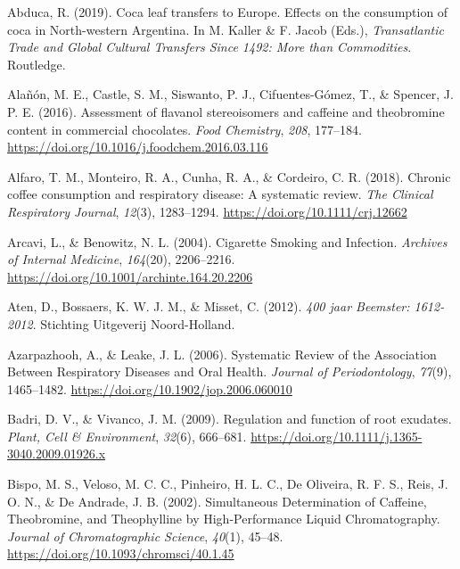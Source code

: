 \documentclass[
  b5paper,
]{book}
\newlength{\cslhangindent}
\newenvironment{CSLReferences}[2] %
 {\begin{list}{}{%
  \setlength{\itemindent}{0pt}
  \setlength{\leftmargin}{0pt}
  \setlength{\parsep}{0pt}
  \ifodd #1
   \setlength{\leftmargin}{\cslhangindent}
   \setlength{\itemindent}{-1\cslhangindent}
  \fi
  \setlength{\itemsep}{#2\baselineskip}}}
 {\end{list}}
\begin{document}
\label{refs-5}
\begin{CSLReferences}{1}{0}
Abduca, R. (2019). Coca leaf transfers to {Europe}. {Effects} on the
consumption of coca in {North-western Argentina}. In M. Kaller \& F.
Jacob (Eds.), \emph{Transatlantic {Trade} and {Global Cultural Transfers
Since} 1492: {More} than {Commodities}}. {Routledge}.

Alañón, M. E., Castle, S. M., Siswanto, P. J., Cifuentes-Gómez, T., \&
Spencer, J. P. E. (2016). Assessment of flavanol stereoisomers and
caffeine and theobromine content in commercial chocolates. \emph{Food
Chemistry}, \emph{208}, 177--184.
\url{https://doi.org/10.1016/j.foodchem.2016.03.116}

Alfaro, T. M., Monteiro, R. A., Cunha, R. A., \& Cordeiro, C. R. (2018).
Chronic coffee consumption and respiratory disease: {A} systematic
review. \emph{The Clinical Respiratory Journal}, \emph{12}(3),
1283--1294. \url{https://doi.org/10.1111/crj.12662}

Arcavi, L., \& Benowitz, N. L. (2004). Cigarette {Smoking} and
{Infection}. \emph{Archives of Internal Medicine}, \emph{164}(20),
2206--2216. \url{https://doi.org/10.1001/archinte.164.20.2206}

Aten, D., Bossaers, K. W. J. M., \& Misset, C. (2012). \emph{{400 jaar
Beemster: 1612-2012}}. {Stichting Uitgeverij Noord-Holland}.

Azarpazhooh, A., \& Leake, J. L. (2006). Systematic {Review} of the
{Association Between Respiratory Diseases} and {Oral Health}.
\emph{Journal of Periodontology}, \emph{77}(9), 1465--1482.
\url{https://doi.org/10.1902/jop.2006.060010}

Badri, D. V., \& Vivanco, J. M. (2009). Regulation and function of root
exudates. \emph{Plant, Cell \& Environment}, \emph{32}(6), 666--681.
\url{https://doi.org/10.1111/j.1365-3040.2009.01926.x}

Bispo, M. S., Veloso, M. C. C., Pinheiro, H. L. C., De Oliveira, R. F.
S., Reis, J. O. N., \& De Andrade, J. B. (2002). Simultaneous
{Determination} of {Caffeine}, {Theobromine}, and {Theophylline} by
{High-Performance Liquid Chromatography}. \emph{Journal of
Chromatographic Science}, \emph{40}(1), 45--48.
\url{https://doi.org/10.1093/chromsci/40.1.45}


\end{CSLReferences}
\end{document}
